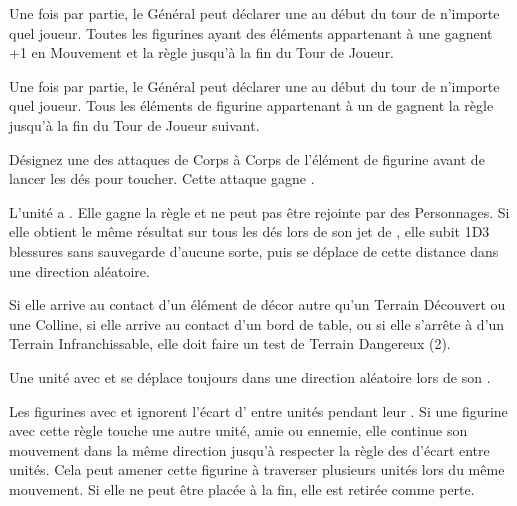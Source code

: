 \begin{multicols}{2}\raggedcolumns
\armyspecialruleentry{\waaargh}

Une fois par partie, le Général peut déclarer une \waaargh{} au début du tour de n'importe quel joueur. Toutes les figurines ayant des éléments appartenant à une \greenhiderace{} gagnent +1 en Mouvement et la règle \swiftstride{} jusqu'à la fin du Tour de Joueur.

\columnbreak
\armyspecialruleentry{\greentide}

Une fois par partie, le Général peut déclarer une \greentide{} au début du tour de n'importe quel joueur. Tous les éléments de figurine appartenant à un \greenhiderace{} de \goblins{} gagnent la règle \fightinextrarank{} jusqu'à la fin du Tour de Joueur suivant.

\end{multicols}

\armyspecialruleentry{\venomousfangs}

Désignez une des attaques de Corps à Corps de l'élément de figurine avant de lancer les dés pour toucher. Cette attaque gagne \multiplewounds{\ordnance}{}.


L'unité a . Elle gagne la règle \immunetopsychology{} et ne peut pas être rejointe par des Personnages. Si elle obtient le même résultat sur tous les dés lors de son jet de \randommovement{}, elle subit 1D3 blessures sans sauvegarde d'aucune sorte, puis se déplace de cette distance dans une direction aléatoire.

Si elle arrive au contact d'un élément de décor autre qu'un Terrain Découvert ou une Colline, si elle arrive au contact d'un bord de table, ou si elle s'arrête à  d'un Terrain Infranchissable, elle doit faire un test de Terrain Dangereux (2).

\armyspecialruleentry{\runningamok}

Une unité avec \shambolic{} et \runningamok{} se déplace toujours dans une direction aléatoire lors de son \randommovement{}.


Les figurines avec \shambolic{} et \ricochet{} ignorent l'écart d' entre unités pendant leur \randommovement{}. Si une figurine avec cette règle touche une autre unité, amie ou ennemie, elle continue son mouvement dans la même direction jusqu'à respecter la règle des  d'écart entre unités. Cela peut amener cette figurine à traverser plusieurs unités lors du même mouvement. Si elle ne peut être placée à la fin, elle est retirée comme perte.

